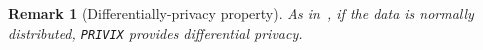 \documentclass[twoside]{article}
\newcommand{\todo}[1]{\textcolor{red}{ToDo:~#1}}
\newtheorem{remark}{Remark}
\newtheorem{assumption}{Assumption}
\newtheorem{definition}{Definition}
\begin{document}

\begin{remark}[Differentially-privacy property]
As in~\cite{li2019privacy}, if the data is normally distributed, \texttt{PRIVIX} provides differential privacy.  
\end{remark}



 


\end{document}
